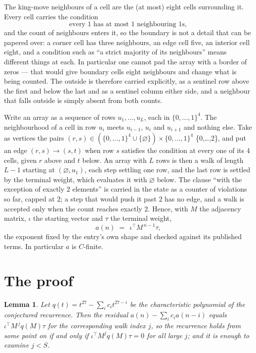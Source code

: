\documentclass[11pt,a4paper]{article}
\theoremstyle{plain}
\newtheorem{lemma}[theorem]{Lemma}
\theoremstyle{definition}
\begin{document}
The king-move neighbours of a cell are the (at most) eight cells surrounding it. Every cell
carries the condition
\[
\text{every }1\text{ has at most }1\text{ neighbouring }1\text{s},
\]
and the count of neighbours enters it, so the boundary is not a detail that can be papered
over: a corner cell has three neighbours, an edge cell five, an interior cell eight, and a
condition such as ``a strict majority of its neighbours'' means different things at each. In
particular one cannot pad the array with a border of zeros --- that would give boundary cells
eight neighbours and change what is being counted. The outside is therefore carried
explicitly, as a sentinel row above the first and below the last and as a sentinel column
either side, and a neighbour that falls outside is simply absent from both counts.

Write an array as a sequence of rows $u_1,\dots,u_L$, each in
$\{0,\dots,1\}^{4}$. The neighbourhood of a cell in row $u_i$ meets $u_{i-1}$,
$u_i$ and $u_{i+1}$ and nothing else. Take as vertices the pairs
$(r,s)\in(\{0,\dots,1\}^{4}\cup\{\varnothing\})\times\{0,\dots,1\}^{4}$ \times \{0,\dots,2\},
and put an edge $(r,s)\to(s,t)$ when row $s$ satisfies the condition at every one of its
$4$ cells, given $r$ above and $t$ below. An array with $L$ rows is then a walk of length
$L-1$ starting at $(\varnothing,u_1)$, each step settling one row, and the last row is
settled by the terminal weight, which evaluates it with $\varnothing$ below. The clause ``with the exception of exactly $2$ elements'' is carried in
the state as a counter of violations so far, capped at $2$; a step that would push it past
$2$ has no edge, and a walk is accepted only when the count reaches exactly $2$. Hence,
with $M$ the adjacency matrix, $\iota$ the starting vector and $\tau$ the terminal weight,
\[
a(n)\;=\;\,\iota^{\!\top}M^{\,n-1}\tau ,
\]
the exponent fixed by the entry's own shape and checked against its published terms. In
particular $a$ is $C$-finite.

\section{The proof}

\begin{lemma}\label{lem:crit}
Let $q(t)=t^{27}-\sum_i c_it^{27-i}$ be the characteristic polynomial of the
conjectured recurrence. Then the residual $a(n)-\sum_ic_ia(n-i)$ equals
$\iota^{\!\top}M^{\,j}q(M)\tau$ for the corresponding walk index $j$, so the
recurrence holds from some point on if and only if $\iota^{\!\top}M^{j}q(M)\tau=0$ for all
large $j$; and it is enough to examine $j<S$.
\end{lemma}
\end{document}
